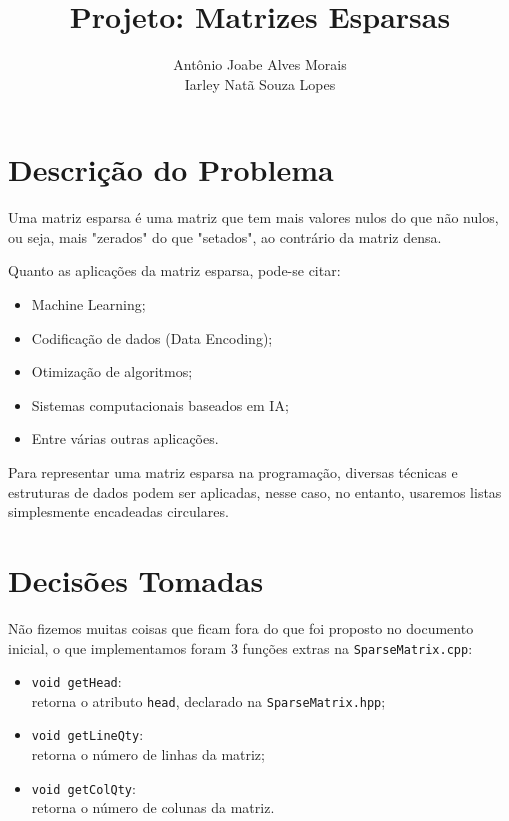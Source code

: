 \documentclass[12pt, letterpaper]{article}
\title{\textbf{Projeto: Matrizes Esparsas}}
\date{}
\author{Antônio Joabe Alves Morais \\ Iarley Natã Souza Lopes}
\begin{document}
	\maketitle

	\section{Descrição do Problema} \label{descr}
		Uma matriz esparsa é uma matriz que tem mais valores nulos do que não nulos, ou seja, mais "zerados" do que "setados", ao contrário da matriz densa.

		Quanto as aplicações da matriz esparsa, pode-se citar: \cite{Brownlee2018, UnivespME2016, Cerebras2019}
		\begin{itemize}
			\item Machine Learning;
			\item Codificação de dados (Data Encoding);
			\item Otimização de algoritmos;
			\item Sistemas computacionais baseados em IA;
			\item Entre várias outras aplicações.
		\end{itemize}

		Para representar uma matriz esparsa na programação, diversas técnicas e estruturas de dados podem ser aplicadas, nesse caso, no entanto, usaremos listas simplesmente encadeadas circulares.
	\section{Decisões Tomadas} \label{decis}
		Não fizemos muitas coisas que ficam fora do que foi proposto no documento inicial, o que implementamos foram 3 funções extras na \verb|SparseMatrix.cpp|:
		\begin{itemize}
			\item \verb|void getHead|: \\
				retorna o atributo \verb|head|, declarado na \verb|SparseMatrix.hpp|;
			\item \verb|void getLineQty|: \\
				retorna o número de linhas da matriz;
			\item \verb|void getColQty|: \\
				retorna o número de colunas da matriz.
		\end{itemize}
\end{document}
